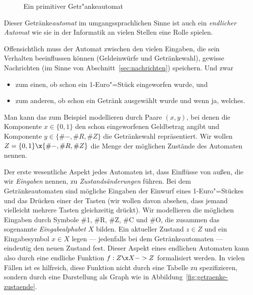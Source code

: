 \begin{figure}[ht]
  \centering
  \caption{Ein primitiver Getr"ankeautomat}
  \label{fig:getraenkeautomat}
\end{figure}

Dieser Getränke\emph{automat} im umgangssprachlichen Sinne ist auch
ein \emph{endlicher Automat} wie sie in der Informatik an vielen
Stellen eine Rolle spielen.

Offensichtlich muss der Automat zwischen den vielen Eingaben, die sein
Verhalten beeinflussen können (Geldeinwürfe und Getränkewahl), gewisse
Nachrichten (im Sinne von Abschnitt~\ref{sec:nachrichten})
speichern. Und zwar
\begin{itemize}
\item zum einen, ob schon ein 1-Euro"=Stück eingeworfen wurde, und
\item zum anderen, ob schon ein Getränk ausgewählt wurde und wenn ja,
  welches.
\end{itemize}
Man kann das zum Beispiel modellieren durch Paare $(x,y)$, bei denen
die Komponente $x\in\{0,1\}$ den schon eingeworfenen Geldbetrag angibt
und Komponente $y\in\{\#-, \#R,\#Z\}$ die Getränkewahl repräsentiert.
Wir wollen $Z=\{0,1\}\x \{\#-, \#R,\#Z\}$ die Menge der möglichen
Zustände des Automaten nennen.

Der erste wesentliche Aspekt jedes Automaten ist, dass Einflüsse von
außen, die wir \emph{Eingaben} nennen, zu \emph{Zustandsänderungen}
führen. Bei dem Getränkeautomaten sind mögliche Eingaben der Einwurf
eines 1-Euro"=Stückes und das Drücken einer der Tasten (wir wollen
davon absehen, dass jemand vielleicht mehrere Tasten gleichzeitig
drückt). Wir modellieren die möglichen Eingaben durch Symbole \#1,
\#R, \#Z, \#C und \#O, die zusammen das sogenannte
\emph{Eingabealphabet} $X$ bilden. Ein aktueller Zustand $z\in Z$ und
ein Eingabesymbol $x\in X$ legen --- jedenfalls bei dem
Getränkeautomaten --- eindeutig den neuen Zustand fest. Dieser Aspekt
eines endlichen Automaten kann also durch eine endliche Funktion
$f:Z\x X->Z$ formalisiert werden. In vielen Fällen ist es hilfreich,
diese Funktion nicht durch eine Tabelle zu spezifizieren, sondern
durch eine Darstellung als Graph wie in Abbildung~\ref{fig:getraenke-zustaende}. 

